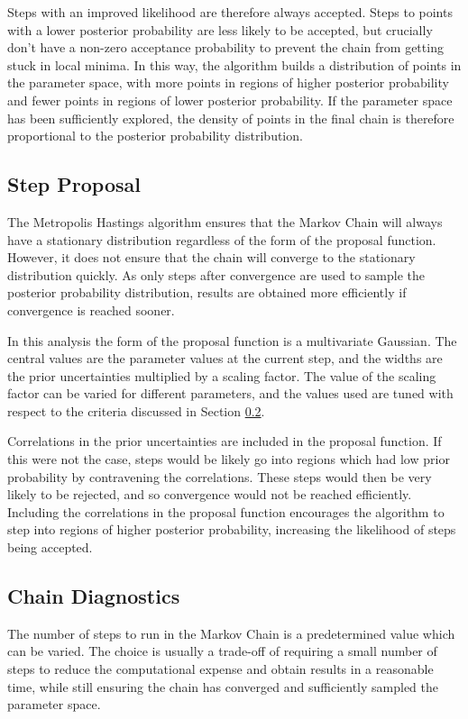Steps with an improved likelihood are therefore always accepted. Steps to points with a lower posterior probability are less likely to be accepted, but crucially don't have a non-zero acceptance probability to prevent the chain from getting stuck in local minima. In this way, the algorithm builds a distribution of points in the parameter space, with more points in regions of higher posterior probability and fewer points in regions of lower posterior probability. If the parameter space has been sufficiently explored, the density of points in the final chain is therefore proportional to the posterior probability distribution. 

\subsection{Step Proposal}\label{sec:stepprop}

The Metropolis Hastings algorithm ensures that the Markov Chain will always have a stationary distribution regardless of the form of the proposal function. However, it does not ensure that the chain will converge to the stationary distribution quickly. As only steps after convergence are used to sample the posterior probability distribution, results are obtained more efficiently if convergence is reached sooner. 

In this analysis the form of the proposal function is a multivariate Gaussian. The central values are the parameter values at the current step, and the widths are the prior uncertainties multiplied by a scaling factor. The value of the scaling factor can be varied for different parameters, and the values used are tuned with respect to the criteria discussed in Section \ref{sec:diag}.

Correlations in the prior uncertainties are included in the proposal function. If this were not the case, steps would be likely go into regions which had low prior probability by contravening the correlations. These steps would then be very likely to be rejected, and so convergence would not be reached efficiently. Including the correlations in the proposal function encourages the algorithm to step into regions of higher posterior probability, increasing the likelihood of steps being accepted.

\subsection{Chain Diagnostics}\label{sec:diag}

The number of steps to run in the Markov Chain is a predetermined value which can be varied. The choice is usually a trade-off of requiring a small number of steps to reduce the computational expense and obtain results in a reasonable time, while still ensuring the chain has converged and sufficiently sampled the parameter space. 


